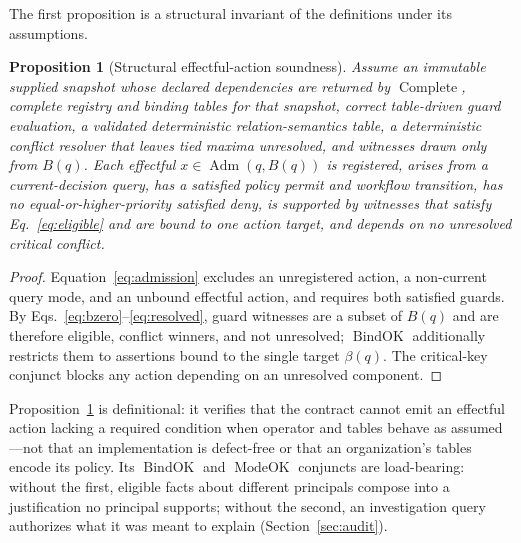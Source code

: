 \documentclass[conference]{IEEEtran}
\newtheorem{proposition}{Proposition}
\begin{document}
The first proposition is a structural invariant of the definitions under its assumptions.
\begin{proposition}[Structural effectful-action soundness]
\label{prop:soundness}
Assume an immutable supplied snapshot whose declared dependencies are returned by $\operatorname{Complete}$, complete registry and binding tables for that snapshot, correct table-driven guard evaluation, a validated deterministic relation-semantics table, a deterministic conflict resolver that leaves tied maxima unresolved, and witnesses drawn only from $B(q)$. Each effectful $x\in \operatorname{Adm}(q,B(q))$ is registered, arises from a current-decision query, has a satisfied policy permit and workflow transition, has no equal-or-higher-priority satisfied deny, is supported by witnesses that satisfy Eq.~\eqref{eq:eligible} \emph{and are bound to one action target}, and depends on no unresolved critical conflict.
\end{proposition}
\begin{proof}
Equation~\eqref{eq:admission} excludes an unregistered action, a non-current query mode, and an unbound effectful action, and requires both satisfied guards. By Eqs.~\eqref{eq:bzero}--\eqref{eq:resolved}, guard witnesses are a subset of $B(q)$ and are therefore eligible, conflict winners, and not unresolved; $\operatorname{BindOK}$ additionally restricts them to assertions bound to the single target $\beta(q)$. The critical-key conjunct blocks any action depending on an unresolved component.\qedhere
\end{proof}
Proposition~\ref{prop:soundness} is definitional: it verifies that the contract cannot emit an effectful action lacking a required condition when operator and tables behave as assumed---not that an implementation is defect-free or that an organization's tables encode its policy. Its $\operatorname{BindOK}$ and $\operatorname{ModeOK}$ conjuncts are load-bearing: without the first, eligible facts about different principals compose into a justification no principal supports; without the second, an investigation query authorizes what it was meant to explain (Section~\ref{sec:audit}).
\end{document}
